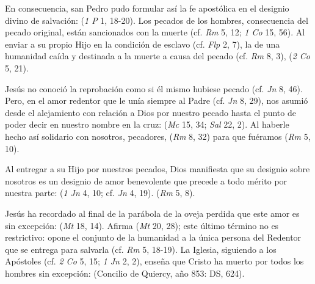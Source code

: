 
\begin{ccebody}

 En consecuencia, san Pedro pudo formular así la fe apostólica en el designio divino de salvación:  (\textit{1 P} 1, 18-20). Los pecados de los hombres, consecuencia del pecado original, están sancionados con la muerte (cf. \textit{Rm} 5, 12; \textit{1 Co} 15, 56). Al enviar a su propio Hijo en la condición de esclavo (cf. \textit{Flp} 2, 7), la de una humanidad caída y destinada a la muerte a causa del pecado (cf. \textit{Rm} 8, 3),  (\textit{2 Co} 5, 21).

 Jesús no conoció la reprobación como si él mismo hubiese pecado (cf. \textit{Jn} 8, 46). Pero, en el amor redentor que le unía siempre al Padre (cf. \textit{Jn} 8, 29), nos asumió desde el alejamiento con relación a Dios por nuestro pecado hasta el punto de poder decir en nuestro nombre en la cruz:  (\textit{Mc} 15, 34; \textit{Sal} 22, 2). Al haberle hecho así solidario con nosotros, pecadores,  (\textit{Rm} 8, 32) para que fuéramos  (\textit{Rm} 5, 10).


 Al entregar a su Hijo por nuestros pecados, Dios manifiesta que su designio sobre nosotros es un designio de amor benevolente que precede a todo mérito por nuestra parte:  (\textit{1 Jn} 4, 10; cf. \textit{Jn} 4, 19).  (\textit{Rm} 5, 8).

 Jesús ha recordado al final de la parábola de la oveja perdida que este amor es sin excepción:  (\textit{Mt} 18, 14). Afirma  (\textit{Mt} 20, 28); este último término no es restrictivo: opone el conjunto de la humanidad a la única persona del Redentor que se entrega para salvarla (cf. \textit{Rm} 5, 18-19). La Iglesia, siguiendo a los Apóstoles (cf. \textit{2 Co} 5, 15; \textit{1 Jn} 2, 2), enseña que Cristo ha muerto por todos los hombres sin excepción:  (Concilio de Quiercy, año 853: DS, 624).


\end{ccebody}
